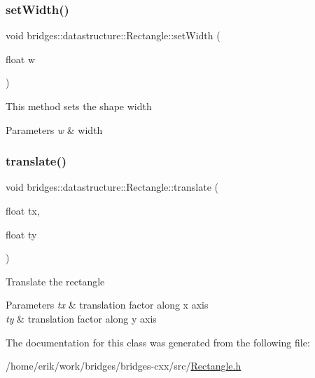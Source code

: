 \mbox{\label{classbridges_1_1datastructure_1_1_rectangle_a7f6182e74816a6c7cf83ae49d5ed55be}} 
\subsubsection{\texorpdfstring{set\+Width()}{setWidth()}}
{\footnotesize\ttfamily void bridges\+::datastructure\+::\+Rectangle\+::set\+Width (\begin{DoxyParamCaption}\item[{float}]{w }\end{DoxyParamCaption})\hspace{0.3cm}{\ttfamily [inline]}}

This method sets the shape width


\begin{DoxyParams}{Parameters}
{\em w} & width \\
\hline
\end{DoxyParams}
\mbox{\label{classbridges_1_1datastructure_1_1_rectangle_a910c2a92c38e2e13bde3f1fd51b17316}} 
\subsubsection{\texorpdfstring{translate()}{translate()}}
{\footnotesize\ttfamily void bridges\+::datastructure\+::\+Rectangle\+::translate (\begin{DoxyParamCaption}\item[{float}]{tx,  }\item[{float}]{ty }\end{DoxyParamCaption})\hspace{0.3cm}{\ttfamily [inline]}}

Translate the rectangle


\begin{DoxyParams}{Parameters}
{\em tx} & translation factor along x axis \\
\hline
{\em ty} & translation factor along y axis \\
\hline
\end{DoxyParams}


The documentation for this class was generated from the following file\+:\begin{DoxyCompactItemize}
\item 
/home/erik/work/bridges/bridges-\/cxx/src/\hyperlink{_rectangle_8h}{Rectangle.\+h}\end{DoxyCompactItemize}
